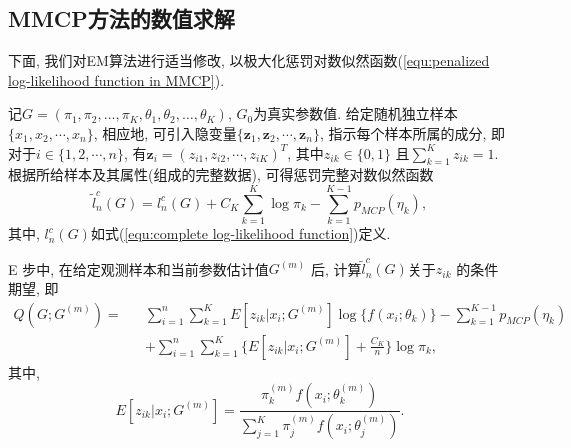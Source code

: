 \documentclass[a4paper,12pt,openany,oneside,utf-8]{ctexbook}
\begin{document}

\subsection{MMCP方法的数值求解}
下面, 我们对EM算法进行适当修改, 以极大化惩罚对数似然函数(\ref{equ:penalized log-likelihood function in MMCP}).

记$G = (\pi_1, \pi_2, \ldots, \pi_K, \theta_1, \theta_2, \ldots, \theta_K)$, $G_0$为真实参数值. 给定随机独立样本$\{x_1, x_2, \cdots, x_n\}$, 相应地, 可引入隐变量$\{ \bm{z}_1, \bm{z}_2, \cdots, \bm{z}_n \}$, 指示每个样本所属的成分, 即对于$i \in \{1, 2, \cdots, n\}$, 有$\bm{z}_i = (z_{i1}, z_{i2}, \cdots, z_{iK})^T$, 其中$z_{ik} \in \{ 0, 1 \}$ 且$\sum_{k=1}^{K}z_{ik}=1$. 根据所给样本及其属性(组成的完整数据), 可得惩罚完整对数似然函数
\begin{equation}
\label{equ:penalized complete log-likelihood function}
  \tilde{l}_{n}^{c}(G)=l_{n}^{c}(G) + C_{K}\sum_{k=1}^{K}\log\pi_{k} - \sum_{k=1}^{K-1}p_{MCP}(\eta_{k}),
\end{equation}
其中, $l_{n}^{c}(G)$如式(\ref{equ:complete log-likelihood function})定义.

E 步中, 在给定观测样本和当前参数估计值$G^{(m)}$ 后, 计算$\tilde{l}_{n}^{c}(G)$关于$z_{ik}$ 的条件期望, 即
\begin{eqnarray}
\label{equ:Q function in revised EM algorithm for MMCP}
  Q(G;G^{(m)}) =&& \sum_{i=1}^{n} \sum_{k=1}^{K} E[z_{ik}|x_i;G^{(m)}] \log\{f(x_{i}; \theta_{k})\}
                   - \sum_{k=1}^{K-1}p_{MCP}(\eta_{k}) \nonumber\\
                && + \sum_{i=1}^{n} \sum_{k=1}^{K} \{ E[z_{ik}|x_i;G^{(m)}] + \frac{C_{K}}{n} \} \log\pi_{k},
\end{eqnarray}
其中,
\begin{equation}
\label{equ:conditional expectation of z_ik in Q function in revised EM algorithm for MMCP}
  E[z_{ik}|x_i;G^{(m)}]
  = \frac{ \pi_k^{(m)} f(x_i; \theta_{k}^{(m)}) }{ \sum_{j=1}^{K} \pi_j^{(m)} f(x_i; \theta_{j}^{(m)}) }.
\end{equation}
\end{document}
